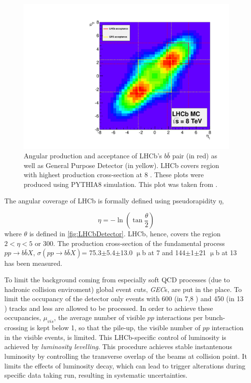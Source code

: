 \begin{figure}
	\centering
	\includegraphics[scale = 0.3]{figs/detector/Acceptance.pdf}
	\caption{Angular production and acceptance of LHCb's $b\bar{b}$ pair (in red) as well as General Purpose Detector (in yellow). LHCb covers region with highest production cross-section at 8 \tev. These plots were produced using PYTHIA8 \cite{pythia8} simulation. This plot was taken from \cite{acceptance}.}
	\label{fig:Acceptance}
\end{figure}

The angular coverage of LHCb is formally defined using pseudorapidity $\eta$, 

\begin{equation}
	\eta = -\ln (\tan\frac{\theta}{2})
\end{equation}	
where $\theta$ is defined in \autoref{fig:LHCbDetector}. \Gls{LHCb}, hence, covers the region $2<\eta<5$ or 300\mrad. The production cross-section of the fundamental process $pp\rightarrow b\bar{b}X$, $\sigma (pp\rightarrow b\bar{b}X)$= 75.3$\pm$5.4$\pm$13.0 $\upmu$b at 7 \tev \cite{LHCb-PAPER-2010-002} and 144$\pm$1$\pm$21 $\upmu$b at 13 \tev \cite{LHCb-PAPER-2016-031} has been measured.

To limit the background coming from especially soft QCD processes (due to hadronic collision enviroment) global event cuts, \textit{GEC}s, are put in the place. To limit the occupancy of the detector only events with 600 (in 7,8 \tev) and 450 (in 13 \tev) tracks and less are allowed to be processed. In order to achieve these occupancies, $\mu_{vis}$, the average number of visible $pp$ interactions per bunch-crossing is kept below 1, so that the pile-up, the visible number of $pp$ interaction in the visible events, is limited. This LHCb-specific control of luminosity is achieved by \textit{luminosity levelling}. This procedure achieves stable instantenous luminosity by controlling the transverse overlap of the beams at collision point. It limits the effects of luminosity decay, which can lead to trigger alterations during specific data taking run, resulting in systematic uncertainties.

